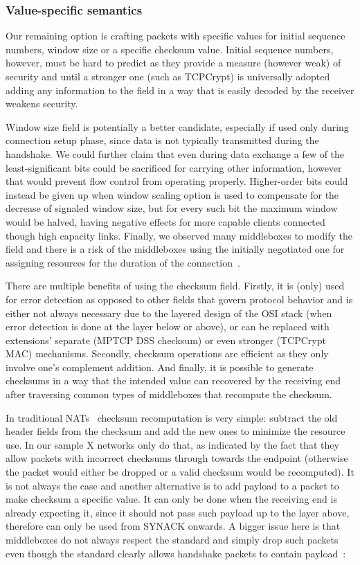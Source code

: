 \documentclass{sig-alternate-10pt}
\begin{document}
\subsubsection*{Value-specific semantics}

Our remaining option is crafting packets with specific values for initial sequence numbers, window size or a specific checksum value. Initial sequence numbers, however, must be hard to predict as they provide a measure (however weak) of security and until a stronger one (such as TCPCrypt) is universally adopted adding any information to the field in a way that is easily decoded by the receiver weakens security.

Window size field is potentially a better candidate, especially if used only during connection setup phase, since data is not typically transmitted during the handshake. We could further claim that even during data exchange a few of the least-significant bits could be sacrificed for carrying other information, however that would prevent flow control from operating properly. Higher-order bits could instead be given up when window scaling option is used to compensate for the decrease of signaled window size, but for every such bit the maximum window would be halved, having negative effects for more capable clients connected though high capacity links. Finally, we observed many middleboxes to modify the field and there is a risk of the middleboxes using the initially negotiated one for assigning resources for the duration of the connection~\cite{}.

There are multiple benefits of using the checksum field. Firstly, it is (only) used for error detection as opposed to other fields that govern protocol behavior and is either not always necessary due to the layered design of the OSI stack (when error detection is done at the layer below or above), or can be replaced with extensions' separate (MPTCP DSS checksum) or even stronger (TCPCrypt MAC) mechanisms. Secondly, checksum operations are efficient as they only involve one's complement addition. And finally, it is possible to generate checksums in a way that the intended value can recovered by the receiving end after traversing common types of middleboxes that recompute the checksum.

In traditional NATs~\cite{Egevang:tu} checksum recomputation is very simple: subtract the old header fields from the checksum and add the new ones to minimize the resource use. In our sample X networks only do that, as indicated by the fact that they allow packets with incorrect checksums through towards the endpoint (otherwise the packet would either be dropped or a valid checksum would be recomputed). It is not always the case and another alternative is to add payload to a packet to make checksum a specific value. It can only be done when the receiving end is already expecting it, since it should not pass such payload up to the layer above, therefore can only be used from SYNACK onwards. A bigger issue here is that middleboxes do not always respect the standard and simply drop such packets even though the standard clearly allows handshake packets to contain payload~\cite{Postel:3EDyoxP_,Chu:2011tn}:
\end{document}
